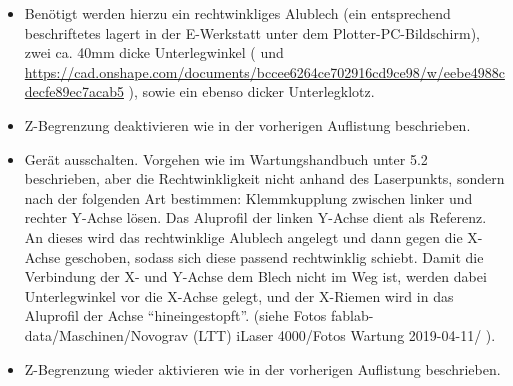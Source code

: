 \documentclass{\basedir/fablab-document}
\renewcommand{\todo}[1]{\textbf{\color{red}{TODO: #1}}}
\begin{document}
\begin{itemize}
	\item Benötigt werden hierzu ein rechtwinkliges Alublech (ein entsprechend beschriftetes lagert in der E-Werkstatt unter dem Plotter-PC-Bildschirm), zwei ca. 40mm dicke Unterlegwinkel (\todo{noch zu fertigen, siehe Fotos fablab-data/Maschinen/Novograv (LTT) iLaser 4000/Fotos Wartung 2019-04-11/ } und \url{https://cad.onshape.com/documents/bccee6264ce702916cd9ce98/w/eebe4988cdecfe89ec7acab5} ), sowie ein ebenso dicker Unterlegklotz.

	\item Z-Begrenzung deaktivieren wie in der vorherigen Auflistung beschrieben.

	\item Gerät ausschalten. Vorgehen wie im Wartungshandbuch unter 5.2 beschrieben, aber die Rechtwinkligkeit nicht anhand des Laserpunkts, sondern nach der folgenden Art bestimmen: Klemmkupplung zwischen linker und rechter Y-Achse lösen. Das Aluprofil der linken Y-Achse dient als Referenz. An dieses wird das rechtwinklige Alublech angelegt und dann gegen die X-Achse geschoben, sodass sich diese passend rechtwinklig schiebt. Damit die Verbindung der X- und Y-Achse dem Blech nicht im Weg ist, werden dabei Unterlegwinkel vor die X-Achse gelegt, und der X-Riemen wird in das Aluprofil der Achse \enquote{hineingestopft}. (siehe Fotos fablab-data/Maschinen/Novograv (LTT) iLaser 4000/Fotos Wartung 2019-04-11/ ).

	\item Z-Begrenzung wieder aktivieren wie in der vorherigen Auflistung beschrieben.
\end{itemize}
\end{document}
